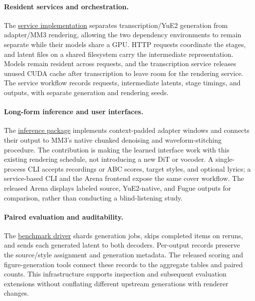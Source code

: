 \documentclass[11pt,a4paper]{article}
\begin{document}
\paragraph{Resident services and orchestration.} The \href{https://github.com/HenryZ838978/fugue/tree/main/services}{service implementation} separates transcription/YuE2 generation from adapter/MM3 rendering, allowing the two dependency environments to remain separate while their models share a GPU. HTTP requests coordinate the stages, and latent files on a shared filesystem carry the intermediate representation. Models remain resident across requests, and the transcription service releases unused CUDA cache after transcription to leave room for the rendering service. The service workflow records requests, intermediate latents, stage timings, and outputs, with separate generation and rendering seeds.

\paragraph{Long-form inference and user interfaces.} The \href{https://github.com/HenryZ838978/fugue/tree/main/fugue}{inference package} implements context-padded adapter windows and connects their output to MM3's native chunked denoising and waveform-stitching procedure. The contribution is making the learned interface work with this existing rendering schedule, not introducing a new DiT or vocoder. A single-process CLI accepts recordings or ABC scores, target styles, and optional lyrics; a service-based CLI and the Arena frontend expose the same cover workflow. The released Arena displays labeled source, YuE2-native, and Fugue outputs for comparison, rather than conducting a blind-listening study.

\paragraph{Paired evaluation and auditability.} The \href{https://github.com/HenryZ838978/fugue/blob/main/research/eval_gen.py}{benchmark driver} shards generation jobs, skips completed items on reruns, and sends each generated latent to both decoders. Per-output records preserve the source/style assignment and generation metadata. The released scoring and figure-generation tools connect these records to the aggregate tables and paired counts. This infrastructure supports inspection and subsequent evaluation extensions without conflating different upstream generations with renderer changes.
\end{document}
